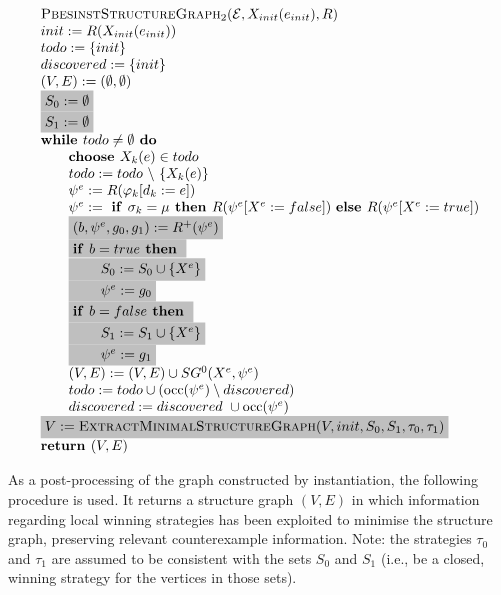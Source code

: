 \documentclass{article}
\newcommand{\Space}{\text{\ }}
\newcommand{\If}{\text{\textbf{if }}}
\newcommand{\Do}{\text{\textbf{ do }}}
\newcommand{\Then}{\text{\textbf{ then }}}
\newcommand{\Else}{\text{\textbf{else }}}
\newcommand{\While}{\text{\textbf{while }}}
\newcommand{\Choose}{\text{\textbf{choose }}}
\newcommand{\Return}{\text{\textbf{return }}}
\begin{document}
\begin{equation*}
\begin{array}{l}
\textsc{PbesinstStructureGraph$_2$}(\mathcal{E}, X_{init}(e_{init}), R) \\ 
init:=R(X_{init}(e_{init})) \\
todo:=\{init\} \\
discovered:=\{init\} \\
(V,E) :=(\emptyset ,\emptyset ) \\ 
\colorbox{lightgray}{$%
S_0:= \emptyset $}\\
\colorbox{lightgray}{$%
S_1:= \emptyset $}\\
\While todo\neq \emptyset \Do \\ 
\qquad \Choose X_{k}(e)\in todo \\ 
\qquad todo:=todo\ \backslash \ \{X_{k}(e)\} \\ 
\qquad \psi ^{e}:=R(\varphi _{k}[d_{k}:=e]) \\ 
\qquad \psi^e := \Space \If \sigma_k = \mu \Then R(\psi^e[X^e := false])
\Space \Else R(\psi^e[X^e := true]) \\
\qquad \colorbox{lightgray}{$%
(b,\psi^e,g_0,g_1) := R^+(\psi^e) $}\\
\qquad \colorbox{lightgray}{$%
\If b = true \Then$}\\
\qquad \colorbox{lightgray}{$ \qquad S_0 := S_0 \cup \{ X^e \} $}\\
\qquad \colorbox{lightgray}{$ \qquad \psi^e := g_0 $}\\
\qquad \colorbox{lightgray}{$%
\If b = false \Then$}\\
\qquad \colorbox{lightgray}{$ \qquad S_1 := S_1 \cup \{ X^e \} $}\\
\qquad \colorbox{lightgray}{$ \qquad \psi^e := g_1 $}\\
\qquad (V,E) := (V,E) \cup SG^{0}(X^{e},\psi ^{e}) \\ 
\qquad todo:=todo\cup (\mathrm{occ}(\psi ^{e})\setminus discovered) \\
\qquad discovered:=discovered\ \cup \mathrm{occ}(\psi ^{e}) \\
\colorbox{lightgray}{$V := \textsc{ExtractMinimalStructureGraph}(V, init, S_0, S_1, \tau_0, \tau_1)$} \\
\Return (V, E)
\end{array}%
\end{equation*}%

As a post-processing of the graph constructed by instantiation, the following procedure is used.
It returns a structure graph $(V,E)$ in which information regarding local winning strategies has been exploited to minimise the structure graph, preserving relevant counterexample information. Note: the strategies $\tau_0$ and $\tau_1$ are assumed to be consistent with the sets $S_0$ and $S_1$ (i.e., be a closed, winning strategy for the vertices in those sets).
\end{document}
